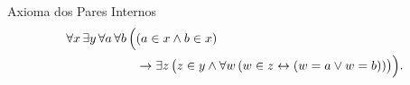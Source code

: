 \begin{displayaxiom}{Axioma dos Pares Internos}
    \[
        \begin{aligned}
            \forall x\, \exists y\, \forall a\, \forall b\, \Bigl(
                &(a \in x \land b \in x) \\
                &\rightarrow \exists z\, \bigl(
                    z \in y
                    \land
                    \forall w\, (w \in z \leftrightarrow (w = a \lor w = b))
                \bigr)
            \Bigr).
        \end{aligned}
    \]
\end{displayaxiom}
